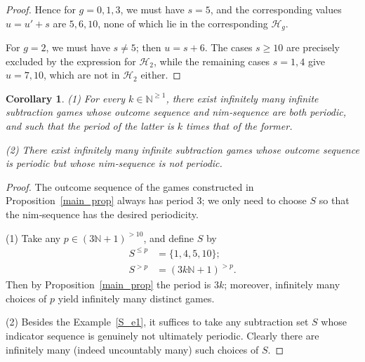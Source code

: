 \documentclass[11pt]{article}
\newtheorem{corollary}{Corollary}[section]
\theoremstyle{definition}
\theoremstyle{plain}
\begin{document}
\begin{proof}
    Hence for $g=0,1,3$, we must have $s=5$, and the corresponding values $u=u'+s$ are $5,6,10$, none of which lie in the corresponding $\mathcal{H}_g$.

    For $g=2$, we must have $s\neq 5$; then $u=s+6$. 
    The cases $s\geq 10$ are precisely excluded by the expression for $\mathcal{H}_2$, while the remaining cases $s=1,4$ give $u=7,10$, which are not in $\mathcal{H}_2$ either.
\end{proof}

\begin{corollary}
    (1) For every $k\in\mathbb{N}^{\geq 1}$, there exist infinitely many infinite subtraction games whose outcome sequence and nim‐sequence are both periodic, and such that the period of the latter is $k$ times that of the former.

    (2) There exist infinitely many infinite subtraction games whose outcome sequence is periodic but whose nim‐sequence is not periodic.
\end{corollary}

\begin{proof}
    The outcome sequence of the games constructed in Proposition~\ref{main_prop} always has period $3$; we only need to choose $S$ so that the nim‐sequence has the desired periodicity.

    (1) Take any $p\in(3\mathbb{N}+1)^{>10}$, and define $S$ by
    \begin{align*}
        S^{\leq p} &= \{1,4,5,10\}; \\
        S^{> p}    &= (3k\mathbb{N}+1)^{> p}.
    \end{align*}
    Then by Proposition~\ref{main_prop} the period is $3k$; moreover, infinitely many choices of $p$ yield infinitely many distinct games.

    (2) Besides the Example~\ref{S_e1}, it suffices to take any subtraction set $S$ whose indicator sequence is genuinely not ultimately periodic.
    Clearly there are infinitely many (indeed uncountably many) such choices of $S$.
\end{proof}



\end{document}
